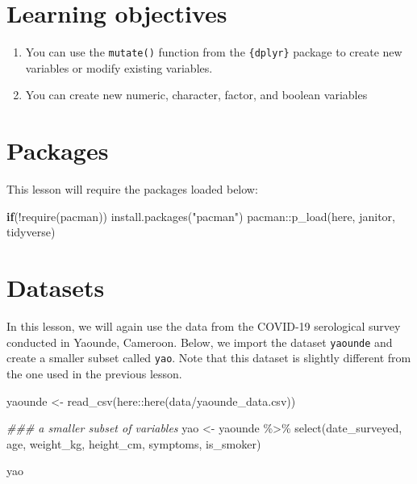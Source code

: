\documentclass[
  letterpaper,
  DIV=11,
  numbers=noendperiod]{scrreprt}
\newenvironment{Shaded}{\begin{snugshade}}{\end{snugshade}}
\newcommand{\ControlFlowTok}[1]{\textcolor[rgb]{0.00,0.23,0.31}{\textbf{#1}}}
\newcommand{\DocumentationTok}[1]{\textcolor[rgb]{0.37,0.37,0.37}{\textit{#1}}}
\newcommand{\FunctionTok}[1]{\textcolor[rgb]{0.28,0.35,0.67}{#1}}
\newcommand{\NormalTok}[1]{\textcolor[rgb]{0.00,0.23,0.31}{#1}}
\newcommand{\OtherTok}[1]{\textcolor[rgb]{0.00,0.23,0.31}{#1}}
\newcommand{\SpecialCharTok}[1]{\textcolor[rgb]{0.37,0.37,0.37}{#1}}
\newcommand{\StringTok}[1]{\textcolor[rgb]{0.13,0.47,0.30}{#1}}
\begin{document}
\section{Learning objectives}\label{learning-objectives-8}

\begin{enumerate}
\def\labelenumi{\arabic{enumi}.}
\item
  You can use the \texttt{mutate()} function from the \texttt{\{dplyr\}}
  package to create new variables or modify existing variables.
\item
  You can create new numeric, character, factor, and boolean variables
\end{enumerate}

\section{Packages}\label{packages-4}

This lesson will require the packages loaded below:

\begin{Shaded}
\begin{Highlighting}[]
\ControlFlowTok{if}\NormalTok{(}\SpecialCharTok{!}\FunctionTok{require}\NormalTok{(pacman)) }\FunctionTok{install.packages}\NormalTok{(}\StringTok{"pacman"}\NormalTok{)}
\NormalTok{pacman}\SpecialCharTok{::}\FunctionTok{p\_load}\NormalTok{(here, }
\NormalTok{               janitor,}
\NormalTok{               tidyverse)}
\end{Highlighting}
\end{Shaded}

\section{Datasets}\label{datasets}

In this lesson, we will again use the data from the COVID-19 serological
survey conducted in Yaounde, Cameroon. Below, we import the dataset
\texttt{yaounde} and create a smaller subset called \texttt{yao}. Note
that this dataset is slightly different from the one used in the
previous lesson.

\begin{Shaded}
\begin{Highlighting}[]
\NormalTok{yaounde }\OtherTok{\textless{}{-}} \FunctionTok{read\_csv}\NormalTok{(here}\SpecialCharTok{::}\FunctionTok{here}\NormalTok{(}\StringTok{\textquotesingle{}data/yaounde\_data.csv\textquotesingle{}}\NormalTok{))}

\DocumentationTok{\#\#\# a smaller subset of variables}
\NormalTok{yao }\OtherTok{\textless{}{-}}\NormalTok{ yaounde }\SpecialCharTok{\%\textgreater{}\%} \FunctionTok{select}\NormalTok{(date\_surveyed, }
\NormalTok{                          age, }
\NormalTok{                          weight\_kg, height\_cm, }
\NormalTok{                          symptoms, is\_smoker)}

\NormalTok{yao}
\end{Highlighting}
\end{Shaded}
\end{document}
